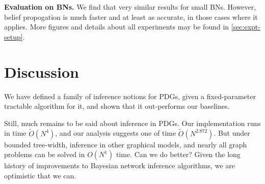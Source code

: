 \textbf{Evaluation on BNs.}
We find that very similar results for small BNs.
However, belief propogation is much faster and at least as accurate,
    in those cases where it applies.
More figures and details about all experiments may be found in \cref{sec:expt-setup}.


\section{Discussion}

We have defined a family of inference notions for PDGs, 
given a fixed-parameter tractable algorithm for it, and shown that it 
out-performs our baselines.

Still, much remains to be said about inference in PDGs. 
Our implementation runs in time $\tilde O(N^4)$, and our analysis suggests one of time $\tilde O(N^{2.872})$. 
But under bounded tree-width, inference in other graphical models, and nearly all graph problems can be solved in $O(N^1)$ time. Can we do better?
Given the long history of improvements 
to Bayesian network inference algorithms,
we are optimistic that we can.


